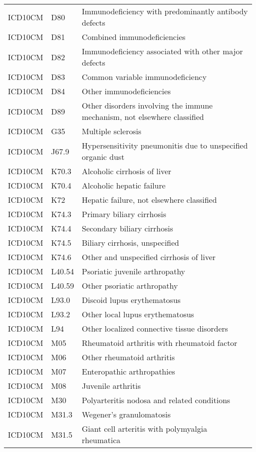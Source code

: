 \begin{table}[ht]
\begin{tabular}{lll}
  ICD10CM & D80 & Immunodeficiency with predominantly antibody defects \\ 
  ICD10CM & D81 & Combined immunodeficiencies \\ 
  ICD10CM & D82 & Immunodeficiency associated with other major defects \\ 
  ICD10CM & D83 & Common variable immunodeficiency \\ 
  ICD10CM & D84 & Other immunodeficiencies \\ 
  ICD10CM & D89 & Other disorders involving the immune mechanism, not elsewhere classified \\ 
  ICD10CM & G35 & Multiple sclerosis \\ 
  ICD10CM & J67.9 & Hypersensitivity pneumonitis due to unspecified organic dust \\ 
  ICD10CM & K70.3 & Alcoholic cirrhosis of liver \\ 
  ICD10CM & K70.4 & Alcoholic hepatic failure \\ 
  ICD10CM & K72 & Hepatic failure, not elsewhere classified \\ 
  ICD10CM & K74.3 & Primary biliary cirrhosis \\ 
  ICD10CM & K74.4 & Secondary biliary cirrhosis \\ 
  ICD10CM & K74.5 & Biliary cirrhosis, unspecified \\ 
  ICD10CM & K74.6 & Other and unspecified cirrhosis of liver \\ 
  ICD10CM & L40.54 & Psoriatic juvenile arthropathy \\ 
  ICD10CM & L40.59 & Other psoriatic arthropathy \\ 
  ICD10CM & L93.0 & Discoid lupus erythematosus \\ 
  ICD10CM & L93.2 & Other local lupus erythematosus \\ 
  ICD10CM & L94 & Other localized connective tissue disorders \\ 
  ICD10CM & M05 & Rheumatoid arthritis with rheumatoid factor \\ 
  ICD10CM & M06 & Other rheumatoid arthritis \\ 
  ICD10CM & M07 & Enteropathic arthropathies \\ 
  ICD10CM & M08 & Juvenile arthritis \\ 
  ICD10CM & M30 & Polyarteritis nodosa and related conditions \\ 
  ICD10CM & M31.3 & Wegener's granulomatosis \\ 
  ICD10CM & M31.5 & Giant cell arteritis with polymyalgia rheumatica \\ 

\end{tabular}
\end{table}
